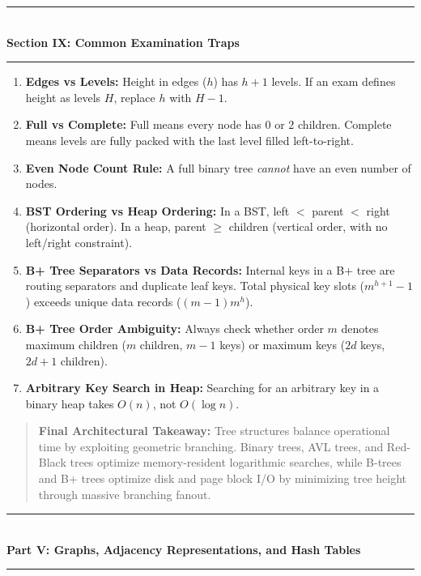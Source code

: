 \begin{center}
\vspace{1em}
{\color{primary}\rule{0.45\textwidth}{1.2pt}}\\[4pt]
{\Large\bfseries\color{primary} Section IX: Common Examination Traps}\\[2pt]
{\color{primary}\rule{0.45\textwidth}{1.2pt}}
\vspace{0.5em}
\end{center}

\begin{enumerate}
    \item \textbf{Edges vs Levels:} Height in edges ($h$) has $h + 1$ levels. If an exam defines height as levels $H$, replace $h$ with $H - 1$.
    \item \textbf{Full vs Complete:} Full means every node has $0$ or $2$ children. Complete means levels are fully packed with the last level filled left-to-right.
    \item \textbf{Even Node Count Rule:} A full binary tree \emph{cannot} have an even number of nodes.
    \item \textbf{BST Ordering vs Heap Ordering:} In a BST, left $<$ parent $<$ right (horizontal order). In a heap, parent $\geq$ children (vertical order, with no left/right constraint).
    \item \textbf{B+ Tree Separators vs Data Records:} Internal keys in a B+ tree are routing separators and duplicate leaf keys. Total physical key slots ($m^{h+1}-1$) exceeds unique data records ($(m-1)m^h$).
    \item \textbf{B+ Tree Order Ambiguity:} Always check whether order $m$ denotes maximum children ($m$ children, $m-1$ keys) or maximum keys ($2d$ keys, $2d+1$ children).
    \item \textbf{Arbitrary Key Search in Heap:} Searching for an arbitrary key in a binary heap takes $O(n)$, not $O(\log n)$.
\end{enumerate}

\begin{quote}
\textbf{Final Architectural Takeaway:} Tree structures balance operational time by exploiting geometric branching. Binary trees, AVL trees, and Red-Black trees optimize memory-resident logarithmic searches, while B-trees and B+ trees optimize disk and page block I/O by minimizing tree height through massive branching fanout.
\end{quote}


\begin{center}
\vspace{1em}
{\color{primary}\rule{0.5\textwidth}{1.5pt}}\\[6pt]
{\Large\bfseries\color{primary} Part V: Graphs, Adjacency Representations, and Hash Tables}\\[3pt]
{\color{primary}\rule{0.5\textwidth}{1.5pt}}
\vspace{1em}
\end{center}

